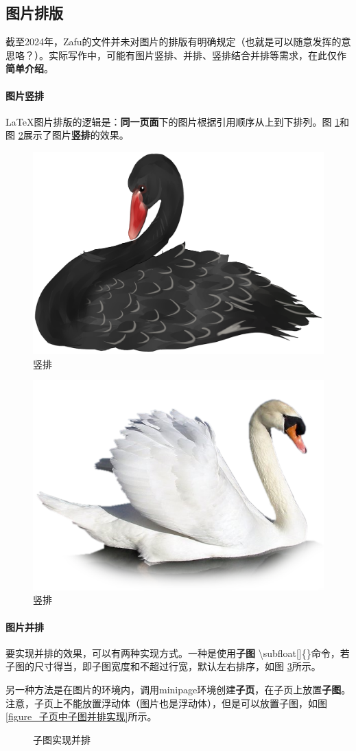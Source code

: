 \documentclass[AutoFakeBold]{ZafuThesis}
\begin{document}
\subsection{图片排版}
截至2024年，Zafu的文件并未对图片的排版有明确规定（也就是可以随意发挥的意思咯？）。实际写作中，可能有图片竖排、并排、竖排结合并排等需求，在此仅作\textbf{简单介绍}。
\paragraph{图片竖排}
\LaTeX 图片排版的逻辑是：\textbf{同一页面}下的图片根据引用顺序从上到下排列。图 \ref{figures_sp0}和图 \ref{figures_sp1}展示了图片\textbf{竖排}的效果。\par
\begin{figure}[htbp]
  \centering
  \includegraphics[width=0.2\columnwidth]{figures/黑天鹅}
  \caption{竖排}
  \label{figures_sp0}
\end{figure}
\begin{figure}[htbp]
  \centering
  \includegraphics[width=0.22\columnwidth]{figures/白天鹅}
  \caption{竖排}
  \label{figures_sp1}
\end{figure}

\paragraph{图片并排}
要实现并排的效果，可以有两种实现方式。一种是使用\textbf{子图} \textbackslash subfloat[]\{\}命令，若子图的尺寸得当，即子图宽度和不超过行宽，默认左右排序，如图 \ref{figure_子图实现并排}所示。\par
另一种方法是在图片的环境内，调用minipage环境创建\textbf{子页}，在子页上放置\textbf{子图}。注意，子页上不能放置浮动体（图片也是浮动体），但是可以放置子图，如图 \ref{figure_子页中子图并排实现}所示。\par

\begin{figure}[htbp]
  \centering
  \hspace{1cm}
  \caption{子图实现并排}  
  \label{figure_子图实现并排}
\end{figure}
\end{document}
